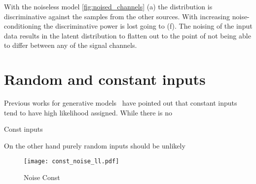 With the noiseless model \cref{fig:noised_channels} (a) the distribution is discriminative against the samples from the other sources. With increasing noise-conditioning the discriminative power is lost going to (f). The noising of the input data results in the latent distribution to flatten out to the point of not being able to differ between any of the signal channels.

\section{Random and constant inputs}
Previous works for generative models~\cite{sonderbyAmortised2017}\cite{vandenoordParallel2017}\cite{nalisnickDeep2019} have pointed out that constant inputs tend to have high likelihood assigned. While there is no

\begin{table}
    \caption{Const inputs}%
    \label{tab:toy_const}%
\end{table}

On the other hand purely random inputs should be unlikely

\begin{figure}
    \centering
    \texttt{[image: const\_noise\_ll.pdf]}%
    \caption{Noise Const}%
    \label{fig:noise_const}%
\end{figure}
